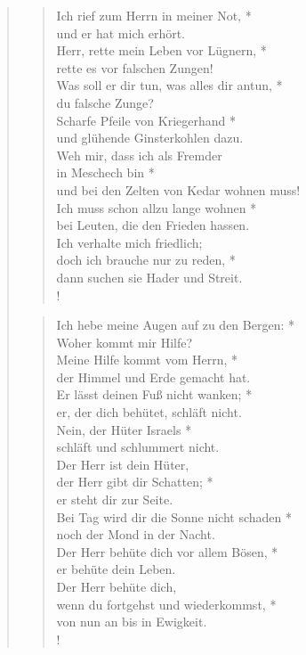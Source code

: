 

\begin{quote}
\begin{verse}


\smallskip

Ich rief zum Herrn in meiner Not, *\\
und er hat mich erhört.\\
\vin Herr, rette mein Leben vor Lügnern, *\\
\vin rette es vor falschen Zungen!\\
Was soll er dir tun, was alles dir antun, *\\
du falsche Zunge?\\
\vin Scharfe Pfeile von Kriegerhand *\\
\vin und glühende Ginsterkohlen dazu.\\
Weh mir, dass ich als Fremder\\
in Meschech bin *\\
und bei den Zelten von Kedar wohnen muss!\\
\vin Ich muss schon allzu lange wohnen *\\
\vin bei Leuten, die den Frieden hassen.\\
Ich verhalte mich friedlich;\\
doch ich brauche nur zu reden, *\\
dann suchen sie Hader und Streit.\\!

\end{verse}

\newpage

\begin{verse}


\smallskip


Ich hebe meine Augen auf zu den Bergen: *\\
Woher kommt mir Hilfe?\\
\vin Meine Hilfe kommt vom Herrn, *\\
\vin der Himmel und Erde gemacht hat.\\
Er lässt deinen Fuß nicht wanken; *\\
er, der dich behütet, schläft nicht.\\
\vin Nein, der Hüter Israels *\\
\vin schläft und schlummert nicht.\\
Der Herr ist dein Hüter, \\
der Herr gibt dir Schatten; *\\
er steht dir zur Seite.\\
\vin Bei Tag wird dir die Sonne nicht schaden *\\
\vin noch der Mond in der Nacht.\\
Der Herr behüte dich vor allem Bösen, *\\
er behüte dein Leben.\\
\vin Der Herr behüte dich,\\
\vin wenn du fortgehst und wiederkommst, *\\
\vin von nun an bis in Ewigkeit.\\!


\end{verse}
\end{quote}
